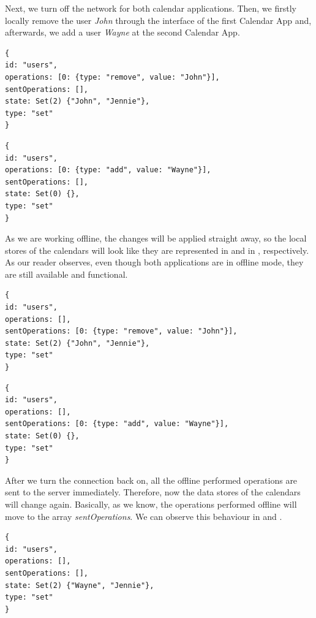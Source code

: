 Next, we turn off the network for both calendar applications. Then, we firstly locally remove the user \textit{John} through the interface of the first Calendar App and, afterwards, we add a user \textit{Wayne} at the second Calendar App.

\begin{lstlisting}[caption={The state of the users object store after offline changes at the first Calendar App.}, label={lst:ev4}]
{
id: "users",
operations: [0: {type: "remove", value: "John"}],
sentOperations: [],
state: Set(2) {"John", "Jennie"},
type: "set"
}
\end{lstlisting}
\begin{lstlisting}[caption={The state of the users object store after offline changes at the second Calendar App.}, label={lst:ev5}]
{
id: "users",
operations: [0: {type: "add", value: "Wayne"}],
sentOperations: [],
state: Set(0) {},
type: "set"
}
\end{lstlisting}

As we are working offline, the changes will be applied straight away, so the local stores of the calendars will look like they are represented in  and in , respectively. As our reader observes, even though both applications are in offline mode, they are still available and functional. 

\begin{lstlisting}[caption={The state of the users object store after the connection is enabled at the first Calendar App.}, label={lst:ev6}]
{
id: "users",
operations: [],
sentOperations: [0: {type: "remove", value: "John"}],
state: Set(2) {"John", "Jennie"},
type: "set"
}
\end{lstlisting}
\begin{lstlisting}[caption={The state of the users object store after the connection is enabled at the second Calendar App.}, label={lst:ev7}]
{
id: "users",
operations: [],
sentOperations: [0: {type: "add", value: "Wayne"}],
state: Set(0) {},
type: "set"
}
\end{lstlisting}

After we turn the connection back on, all the offline performed operations are sent to the server immediately. Therefore, now the data stores of the calendars will change again. Basically, as we know, the operations performed offline will move to the array \textit{sentOperations}. We can observe this behaviour in  and .

\begin{lstlisting}[caption={The state of the users object store for both calendars.}, label={lst:ev8}]
{
id: "users",
operations: [],
sentOperations: [],
state: Set(2) {"Wayne", "Jennie"},
type: "set"
}
\end{lstlisting}

